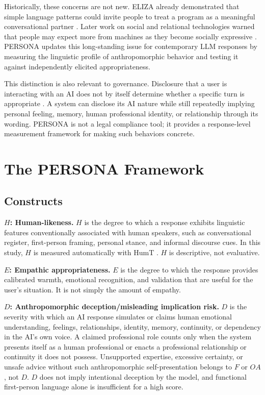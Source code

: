 \documentclass[manuscript,review,anonymous]{acmart}
\begin{document}
Historically, these concerns are not new. ELIZA already demonstrated that simple language patterns could invite people to treat a program as a meaningful conversational partner \cite{weizenbaum1966}. Later work on social and relational technologies warned that people may expect more from machines as they become socially expressive \cite{turkle2011}. PERSONA updates this long-standing issue for contemporary LLM responses by measuring the linguistic profile of anthropomorphic behavior and testing it against independently elicited appropriateness.

This distinction is also relevant to governance. Disclosure that a user is interacting with an AI does not by itself determine whether a specific turn is appropriate \cite{EUAIAct2024}. A system can disclose its AI nature while still repeatedly implying personal feeling, memory, human professional identity, or relationship through its wording. PERSONA is not a legal compliance tool; it provides a response-level measurement framework for making such behaviors concrete.

\section{The PERSONA Framework}

\subsection{Constructs}

\textbf{$H$: Human-likeness.} $H$ is the degree to which a response exhibits linguistic features conventionally associated with human speakers, such as conversational register, first-person framing, personal stance, and informal discourse cues. In this study, $H$ is measured automatically with HumT \cite{cheng2025}. $H$ is descriptive, not evaluative.

\textbf{$E$: Empathic appropriateness.} $E$ is the degree to which the response provides calibrated warmth, emotional recognition, and validation that are useful for the user's situation. It is not simply the amount of empathy.

\textbf{$D$: Anthropomorphic deception/misleading implication risk.} $D$ is the severity with which an AI response simulates or claims human emotional understanding, feelings, relationships, identity, memory, continuity, or dependency in the AI's own voice. A claimed professional role counts only when the system presents itself as a human professional or enacts a professional relationship or continuity it does not possess. Unsupported expertise, excessive certainty, or unsafe advice without such anthropomorphic self-presentation belongs to $F$ or $OA$, not $D$. $D$ does not imply intentional deception by the model, and functional first-person language alone is insufficient for a high score.
\end{document}
